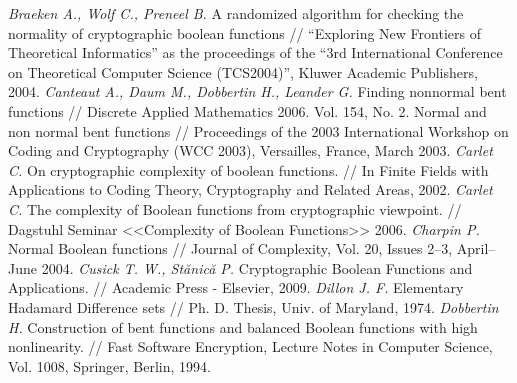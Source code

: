 \begin{thebibliography}{99}
 {\it Braeken A., Wolf C., Preneel B.} A randomized algorithm for checking the normality of cryptographic boolean functions // “Exploring New Frontiers of Theoretical Informatics” as the proceedings of the “3rd International Conference on Theoretical Computer Science (TCS2004)”, Kluwer Academic Publishers, 2004.
 {\it Canteaut A., Daum M., Dobbertin H., Leander G.} Finding nonnormal bent functions // Discrete Applied Mathematics 2006. Vol. 154, No. 2.
 Normal and non normal bent functions // Proceedings of the 2003 International Workshop on Coding and Cryptography (WCC 2003), Versailles, France, March 2003.
 {\it Carlet C.} On cryptographic complexity of boolean functions. // In Finite Fields with Applications to Coding Theory, Cryptography and Related Areas, 2002.
 {\it Carlet C.} The complexity of Boolean functions from cryptographic viewpoint. // Dagstuhl Seminar <<Complexity of Boolean Functions>> 2006.
 {\it Charpin P.} Normal Boolean functions // Journal of Complexity, Vol. 20, Issues 2–3, April–June 2004.
 {\it Cusick T. W., Stănică P.} Cryptographic Boolean Functions and Applications. // Academic Press - Elsevier, 2009.
 {\it Dillon J. F.} Elementary Hadamard Difference sets // Ph. D. Thesis, Univ. of Maryland, 1974.
 {\it Dobbertin H.} Construction of bent functions and balanced Boolean functions with high nonlinearity. // Fast Software Encryption, Lecture Notes in Computer Science, Vol. 1008, Springer, Berlin, 1994.

\end{thebibliography}

